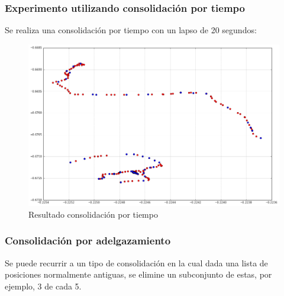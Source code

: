 \documentclass[10pt, spanish]{beamer}
\begin{document}
\begin{frame}[fragile]
\frametitle{Experimento utilizando consolidaci\'on por tiempo}
Se realiza una consolidaci\'on por tiempo con un lapso de 20 segundos:\\

\bigskip

\begin{figure}[H]
	\includegraphics[scale=.25]{byTimeSuj1.png}
	\caption{Resultado consolidaci\'on por tiempo}
\end{figure}

\end{frame}


\begin{frame}[fragile]
\frametitle{Consolidaci\'on por adelgazamiento}
Se puede recurrir a un tipo de consolidaci\'on en la cual dada una lista de posiciones normalmente antiguas, se elimine un subconjunto de estas, por ejemplo, 3 de cada 5.\\
\bigskip
\begin{algorithmic}[1]
			\EndFor
		\EndIf
	\EndFor
\EndFunction
\end{algorithmic}
\end{frame}
\end{document}
